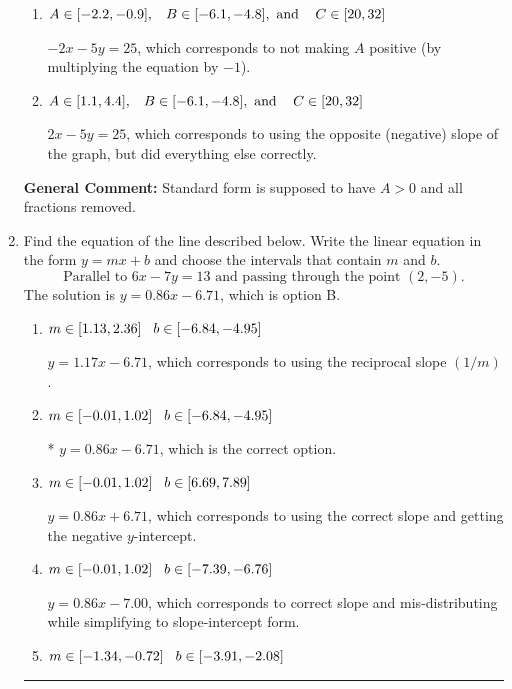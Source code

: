\documentclass{extbook}[14pt]
\newcommand{\litem}[1]{\item #1

\rule{\textwidth}{0.4pt}}
\begin{document}
\begin{enumerate}
{\begin{enumerate}[label=\Alph*.]
* $2x + 5y = -25$, which is the correct option.
\item \( A \in [-2.2, -0.9], \hspace{3mm} B \in [-6.1, -4.8], \text{ and } \hspace{3mm} C \in [20, 32] \)

 $-2x - 5y = 25$, which corresponds to not making $A$ positive (by multiplying the equation by $-1$).
\item \( A \in [1.1, 4.4], \hspace{3mm} B \in [-6.1, -4.8], \text{ and } \hspace{3mm} C \in [20, 32] \)

 $2x - 5y = 25$, which corresponds to using the opposite (negative) slope of the graph, but did everything else correctly.
\end{enumerate}

\textbf{General Comment:} Standard form is supposed to have $A > 0$ and all fractions removed.
}
\litem{
Find the equation of the line described below. Write the linear equation in the form $ y=mx+b $ and choose the intervals that contain $m$ and $b$.
\[ \text{Parallel to } 6 x - 7 y = 13 \text{ and passing through the point } (2, -5). \]The solution is \( y = 0.86x - 6.71 \), which is option B.\begin{enumerate}[label=\Alph*.]
\item \( m \in [1.13, 2.36] \hspace*{3mm} b \in [-6.84, -4.95] \)

 $y = 1.17x - 6.71$, which corresponds to using the reciprocal slope $(1/m)$.
\item \( m \in [-0.01, 1.02] \hspace*{3mm} b \in [-6.84, -4.95] \)

* $y = 0.86x - 6.71$, which is the correct option.
\item \( m \in [-0.01, 1.02] \hspace*{3mm} b \in [6.69, 7.89] \)

 $y = 0.86x + 6.71$, which corresponds to using the correct slope and getting the negative $y$-intercept.
\item \( m \in [-0.01, 1.02] \hspace*{3mm} b \in [-7.39, -6.76] \)

 $y = 0.86x - 7.00$, which corresponds to correct slope and mis-distributing while simplifying to slope-intercept form.
\item \( m \in [-1.34, -0.72] \hspace*{3mm} b \in [-3.91, -2.08] \)


\end{enumerate}}
\end{enumerate}
\end{document}
